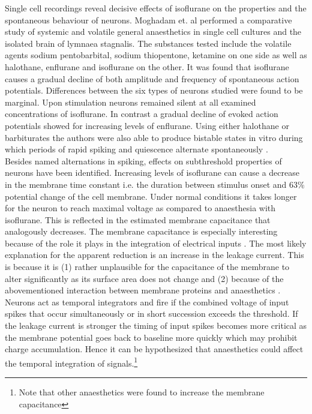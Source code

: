 Single cell recordings reveal decisive effects of isoflurane on the properties and the spontaneous behaviour of neurons. Moghadam et. al \parencite*{moghadam2019comparative} performed a comparative study of systemic and volatile general anaesthetics in single cell cultures and the isolated brain of lymnaea stagnalis. The substances tested include the volatile agents sodium pentobarbital, sodium thiopentone, ketamine on one side as well as halothane, enflurane and isoflurane on the other. It was found that isoflurane causes a gradual decline of both amplitude and frequency of spontaneous action potentials. Differences between the six types of neurons studied were found to be marginal. Upon stimulation neurons remained silent at all examined concentrations of isoflurane. In contrast a gradual decline of evoked action potentials showed for increasing levels of enflurane. Using either halothane or barbiturates the authors were also able to produce bistable states in vitro during which periods of rapid spiking and quiescence alternate spontaneously \parencite{moghadam2019comparative}.\\
Besides named alternations in spiking, effects on subthreshold properties of neurons have been identified. Increasing levels of isoflurane can cause a decrease in the membrane time constant i.e. the duration between stimulus onset and 63\% potential change of the cell membrane. Under normal conditions it takes longer for the neuron to reach maximal voltage as compared to anaesthesia with isoflurane. This is reflected in the estimated membrane capacitance that analogously decreases. The membrane capacitance is especially interesting because of the role it plays in the integration of electrical inputs \parencite{golowasch2014}. The most likely explanation for the apparent reduction is an increase in the leakage current. This is because it is (1) rather unplausible for the capacitance of the membrane to alter significantly as its surface area does not change and (2) because of the abovementioned interaction between membrane proteins and anaesthetics \parencite{qazzaz2017modulation}. Neurons act as temporal integrators and fire if the combined voltage of input spikes that occur simultaneously or in short succession exceeds the threshold. If the leakage current is stronger the timing of input spikes becomes more critical as the membrane potential goes back to baseline more quickly which may prohibit charge accumulation. Hence it can be hypothesized that anaesthetics could affect the temporal integration of signals.\footnote{ Note that other anaesthetics were found to increase the membrane capacitance}\\
